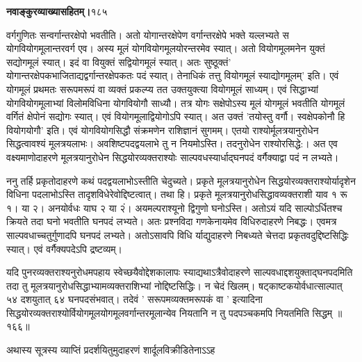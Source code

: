\documentclass[11pt, openany]{book}
\begin{document}
\onehalfspacing
\hspace{2in}\textbf{नवाङ्कुरव्याख्यासहितम्।}\hspace{2in}१८५

\vspace{5mm}

\begin{sloppypar}
\hangindent=0.2in वर्गगुणितः सन्वर्गान्तरक्षेपो भवतीति। अतो योगान्तरक्षेपेण वर्गान्तरक्षेपे भक्ते यल्लभ्यते स योगवियोगमूलान्तरवर्ग एव। अस्य मूलं योगवियोगमूलयोरन्तरमेव स्यात्। अतो वियोगमूलमनेन युक्तं सद्योगमूलं स्यात्। इदं वा वियुक्तं सद्वियोगमूलं स्यात्। अतः सुष्ठूक्तं' योगान्तरक्षेपकभाजिताद्यद्वर्गान्तरक्षेपकतः पदं स्यात्। तेनाधिकं तत्तु वियोगमूलं स्याद्योगमूलम्' इति। एवं योगमूलं प्रथमतः सरूपमरूपं वा व्यक्तं प्रकल्प्य तत उक्तयुक्त्या वियोगमूलं साध्यम्। एवं सिद्धाभ्यां योगवियोगमूलाभ्यां विलोमविधिना योगवियोगौ साध्यौ। तत्र योगः सक्षेपोऽस्य मूलं योगमूलं भवतीति योगमूलं वर्गितं क्षेपोनं सद्योगः स्यात्। एवं वियोगमूलाद्वियोगोऽपि स्यात्। अत उक्तं 'तयोस्तु वर्गौ। स्वक्षेपकोनौ हि वियोगयोगौ' इति। एवं योगवियोगसिद्धौ संक्रमणेन राशिज्ञानं सुगमम्। एतयो राश्योर्मूलत्रयानुरोधेन सिद्धत्वावश्यं मूलत्रयलाभः। अवशिष्टपदद्वयलाभे तु न नियमोऽस्ति। तदनुरोधेन राश्योरसिद्धे:। अत एव वक्ष्यमाणोदाहरणे मूलत्रयानुरोधेन सिद्धयोरव्यक्तराश्योः साल्पवधस्यार्धाद्घनपदं वर्गैक्याद्वा पदं न लभ्यते।

\hangindent=0.2in \hspace{0.2in}ननु तर्हि प्रकृतोदाहरणे कथं पदद्वयलाभोऽस्तीति चेदुच्यते। प्रकृते मूलत्रयानुरोधेन सिद्धयोरव्यक्तराश्योर्यादृशेन विधिना पदलाभोऽस्ति तादृशविधेरेवोद्दिष्टत्वात्। तथा हि। प्रकृते मूलत्रयानुरोधसिद्धावव्यक्तराशी याव १ रू १। या २। अनयोर्वधः याघ २ या २ं। अयमल्पराश्यूनो द्विगुणो घनोऽस्ति। अतोऽयं यदि साल्पोऽर्धितश्च क्रियते तदा घनो भवतीति घनपदं लभ्यते। अतः प्रश्नविदा गणकेनायमेव विधिरुदाहरणे निबद्धः। एवमत्र साल्पवधाच्चतुर्गुणादपि घनपदं लभ्यते। अतोऽसावपि विधि र्याद्युदाहरणे निबध्यते चेत्तदा प्रकृतवदुद्दिष्टसिद्धिः स्यात्। एवं वर्गैक्यपदेऽपि द्रष्टव्यम्।

\hangindent=0.2in \hspace{0.2in}यदि पुनरव्यक्तराश्यनुरोधमपहाय स्वेच्छयैवोद्देशकालापः स्याद्यथाऽत्रैवोदाहरणे साल्पवधाद्दशयुक्ताद्घनपदमिति तदा तु मूलत्रयानुरोधसिद्धाभ्यामव्यक्तराशिभ्यां नोद्दिष्टसिद्धिः। न चेदं खिलम्। षट्काष्टकयोर्वधात्साल्पात् ५४ दशयुतात् ६४ घनपदसंभवात्। तदेवं ' सरूपमव्यक्तमरूपकं वा ' इत्यादिना सिद्धयोरव्यक्तराश्योर्वियोगमूलयोगमूलवर्गान्तरमूलान्येव नियतानि न तु पदपञ्चकमपि नियतमिति सिद्धम् ॥१६६॥

\hangindent=0.2in \hspace{0.2in}अथास्य सूत्रस्य व्याप्तिं प्रदर्शयितुमुदाहरणं शार्दूलविक्रीडितेनाऽऽह\textendash


\end{sloppypar}
\end{document}
